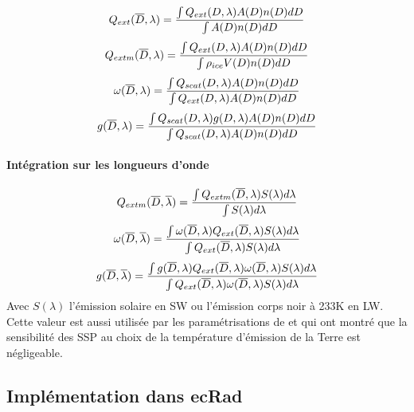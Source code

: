 \begin{equation}
    Q_{ext} (\overline{D},\lambda ) = \frac{\int Q_{ext}(D, \lambda) A(D) n(D) dD}{\int A(D) n(D) dD}
\end{equation}
\begin{equation}
    Q_{extm} (\overline{D},\lambda ) = \frac{\int Q_{ext}(D, \lambda) A(D) n(D) dD}{\int \rho_{ice}V(D) n(D) dD}
\end{equation}
\begin{equation}
    \omega(\overline{D},\lambda ) =\frac{\int Q_{scat}(D, \lambda) A(D) n(D) dD}{\int Q_{ext} (D, \lambda)A(D) n(D) dD}
\end{equation}
\begin{equation}
    g(\overline{D},\lambda ) =\frac{\int Q_{scat}(D, \lambda) g(D, \lambda) A(D) n(D) dD}{\int Q_{scat} (D, \lambda)A(D) n(D) dD}
\end{equation}

\paragraph{Intégration sur les longueurs d'onde}

\begin{equation}
    Q_{extm} (\overline{D},\overline{\lambda} ) = 
    \frac{\int Q_{extm}(\overline{D}, \lambda) S(\lambda) d\lambda}
    {\int  S(\lambda) d\lambda}
\end{equation}
\begin{equation}
    \omega(\overline{D},\overline{\lambda}) = 
    \frac{\int \omega (\overline{D},\lambda) Q_{ext}(\overline{D}, \lambda) S(\lambda) d\lambda}
    {\int Q_{ext} (\overline{D}, \lambda) S (\lambda) d \lambda }
\end{equation}
\begin{equation}
    g (\overline{D},\overline{\lambda}) = 
    \frac{\int g(\overline{D},\lambda) Q_{ext}(\overline{D}, \lambda)  \omega (\overline{D},\lambda) S(\lambda) d\lambda}
    {\int Q_{ext} (\overline{D}, \lambda) \omega (\overline{D},\lambda) S (\lambda) d \lambda }
\end{equation}
Avec $S(\lambda)$ l'émission solaire en SW ou l'émission corps noir à 233K en LW. Cette valeur est aussi utilisée par les paramétrisations de \cite{fu_accurate_1996} et \cite{yi_influence_2013} qui ont montré que la sensibilité des SSP au choix de la température d'émission de la Terre est négligeable.

\subsection{Implémentation dans ecRad}

